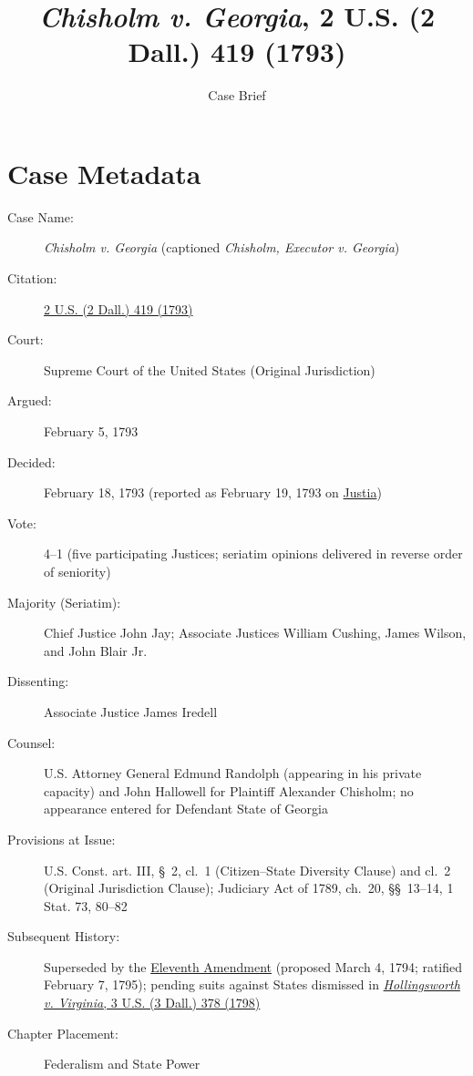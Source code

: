 \documentclass[12pt]{article}
\title{\textit{Chisholm v. Georgia}, 2 U.S. (2 Dall.) 419 (1793)}
\author{Case Brief}
\date{}
\begin{document}
\maketitle


\section{Case Metadata}

\begin{description}
  \item[Case Name:] \emph{Chisholm v. Georgia} (captioned \emph{Chisholm, Executor v. Georgia})
  \item[Citation:] \href{https://supreme.justia.com/cases/federal/us/2/419/}{2 U.S. (2 Dall.) 419 (1793)}
  \item[Court:] Supreme Court of the United States (Original Jurisdiction)
  \item[Argued:] February 5, 1793
  \item[Decided:] February 18, 1793 (reported as February 19, 1793 on \href{https://supreme.justia.com/cases/federal/us/2/419/}{Justia})
  \item[Vote:] 4--1 (five participating Justices; seriatim opinions delivered in reverse order of seniority)
  \item[Majority (Seriatim):] Chief Justice John Jay; Associate Justices William Cushing, James Wilson, and John Blair Jr.
  \item[Dissenting:] Associate Justice James Iredell
  \item[Counsel:] U.S. Attorney General Edmund Randolph (appearing in his private capacity) and John Hallowell for Plaintiff Alexander Chisholm; no appearance entered for Defendant State of Georgia
  \item[Provisions at Issue:] U.S. Const. art. III, \S~2, cl.~1 (Citizen--State Diversity Clause) and cl.~2 (Original Jurisdiction Clause); Judiciary Act of 1789, ch.~20, \S\S~13--14, 1 Stat. 73, 80--82
  \item[Subsequent History:] Superseded by the \href{https://www.law.cornell.edu/constitution-conan/amendment-11/historical-background-on-eleventh-amendment}{Eleventh Amendment} (proposed March 4, 1794; ratified February 7, 1795); pending suits against States dismissed in \href{https://supreme.justia.com/cases/federal/us/3/378/}{\emph{Hollingsworth v. Virginia}, 3 U.S. (3 Dall.) 378 (1798)}
  \item[Chapter Placement:] Federalism and State Power
\end{description}
\end{document}

